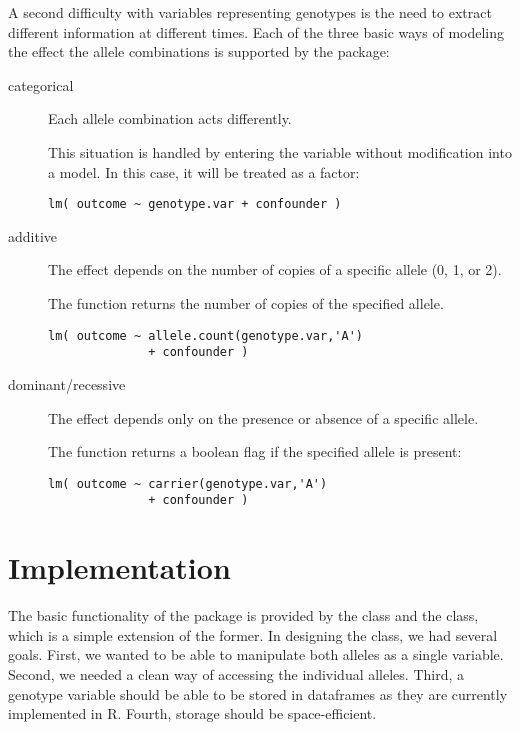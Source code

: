 \documentclass{report}
\begin{document}
A second difficulty with variables representing genotypes is the need
to extract different information at different times.  Each of the
three basic ways of modeling the effect the allele combinations is
supported by the  package:
\begin{description}
\item[categorical] Each allele combination acts differently.
  
  This situation is handled by entering the  variable without
  modification into a model.  In this case, it will be treated as a
  factor:

{\small
\begin{verbatim}
lm( outcome ~ genotype.var + confounder )
\end{verbatim}
}
  
\item[additive] The effect depends on the number of copies of a
  specific allele (0, 1, or 2).
  
  The function  returns the number
  of copies of the specified allele.
  
{\small
\begin{verbatim}
lm( outcome ~ allele.count(genotype.var,'A') 
              + confounder )
\end{verbatim}
}
  
\item[dominant/recessive] The effect depends only on the presence or
  absence of a specific allele.
  
  The function  returns a boolean flag
  if the specified allele is present:

{\small
\begin{verbatim}
lm( outcome ~ carrier(genotype.var,'A') 
              + confounder )
\end{verbatim}
}

\end{description}




\section{Implementation}

The basic functionality of the  package is provided by
the  class and the  class, which is a
simple extension of the former.  In designing the 
class, we had several goals.  First, we wanted to be able to
manipulate both alleles as a single variable.  Second, we needed a
clean way of accessing the individual alleles.  Third, a genotype
variable should be able to be stored in dataframes as they are
currently implemented in R.  Fourth, storage should be
space-efficient.
\end{document}
